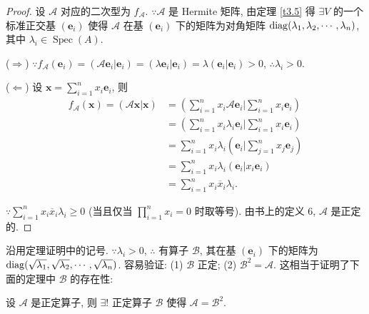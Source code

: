 \documentclass[color=black,device=normal,lang=cn,mode=geye]{elegantnote}
\begin{document}
\begin{proof}
    设 $\mathcal{A}$ 对应的二次型为 $f_\mathcal{A}$. $\because\mathcal{A}$ 是 Hermite 矩阵, 由定理 \ref{t3.5} 得 $\exists V$ 的一个标准正交基 $(\boldsymbol{e}_i)$ 使得 $\mathcal{A}$ 在基 $(\boldsymbol{e}_i)$ 下的矩阵为对角矩阵 $\operatorname{diag} (\lambda_1,\lambda_2,\cdots,\lambda_n)$, 其中 $\lambda_i\in\operatorname{Spec}(A)$.

    ($\Rightarrow$) $\because f_\mathcal{A}(\boldsymbol{e}_i)=(\mathcal{A}\boldsymbol{e}_i|\boldsymbol{e}_i)=(\lambda\boldsymbol{e}_i|\boldsymbol{e}_i)=\lambda(\boldsymbol{e}_i|\boldsymbol{e}_i)>0$, $\therefore\lambda_i>0$.

    ($\Leftarrow$) 设 $\boldsymbol{x}=\sum\limits_{i=1}^nx_i\boldsymbol{e}_i$, 则
    \begin{align*}
        f_\mathcal{A}(\boldsymbol{x})=(\mathcal{A}\boldsymbol{x}|\boldsymbol{x}) & =\left(\sum\limits_{i=1}^nx_i\mathcal{A}\boldsymbol{e}_i\Bigg|\sum\limits_{i=1}^nx_i\boldsymbol{e}_i\right) \\
        & =\left(\sum\limits_{i=1}^nx_i\lambda_i\boldsymbol{e}_i\Bigg|\sum\limits_{i=1}^nx_i\boldsymbol{e}_i\right) \\
        & =\sum\limits_{i=1}^nx_i\lambda_i\left(\boldsymbol{e}_i\Bigg|\sum\limits_{j=1}^nx_j\boldsymbol{e}_j\right) \\
        & =\sum\limits_{i=1}^nx_i\lambda_i\left(\boldsymbol{e}_i|x_i\boldsymbol{e}_i\right) \\
        & =\sum\limits_{i=1}^nx_i\overline{x}_i\lambda_i.
    \end{align*}

    $\because\sum\limits_{i=1}^nx_i\overline{x}_i\lambda_i\geq0$ (当且仅当 $\prod\limits_{i=1}^nx_i=0$ 时取等号). 由书上的定义 6, $\mathcal{A}$ 是正定的.
\end{proof}
沿用定理证明中的记号. $\because\lambda_i>0$, $\therefore$ 有算子 $\mathcal{B}$, 其在基 $(\boldsymbol{e}_i)$ 下的矩阵为 $\operatorname{diag} (\sqrt{\lambda_1},\sqrt{\lambda_2},\cdots,\sqrt{\lambda_n})$. 容易验证: (1) $\mathcal{B}$ 正定; (2) $\mathcal{B}^2=\mathcal{A}$. 这相当于证明了下面的定理中 $\mathcal{B}$ 的存在性:
\begin{theorem}[书上的命题 1]
    设 $\mathcal{A}$ 是正定算子, 则 $\exists!$ 正定算子 $\mathcal{B}$ 使得 $\mathcal{A}=\mathcal{B}^2$.
\end{theorem}
\end{document}
